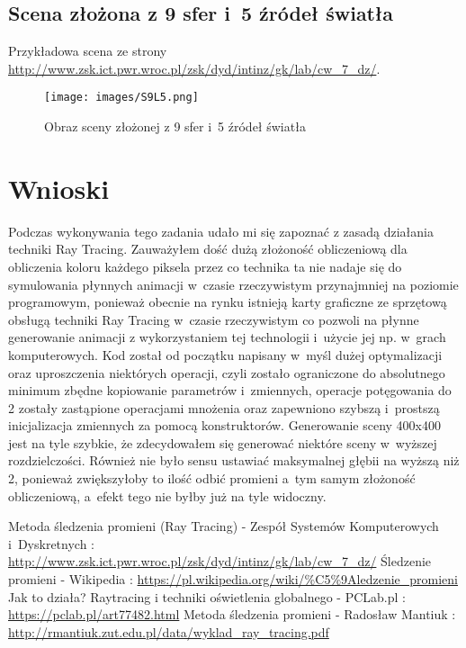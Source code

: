 \documentclass[11pt,a4paper,titlepage]{article}
\begin{document}
\newpage
\subsection{Scena złożona z 9 sfer i~5 źródeł światła}
Przykładowa scena ze strony \url{http://www.zsk.ict.pwr.wroc.pl/zsk/dyd/intinz/gk/lab/cw_7_dz/}.
\begin{figure}[H]
\centering
\texttt{[image: images/S9L5.png]}
\caption{Obraz sceny złożonej z 9 sfer i~5 źródeł światła}
\label{fig:eggWithLight}
\end{figure}

\section{Wnioski}
Podczas wykonywania tego zadania udało mi się zapoznać z zasadą działania techniki Ray Tracing. Zauważyłem dość dużą złożoność obliczeniową dla obliczenia koloru każdego piksela przez co technika ta nie nadaje się do symulowania płynnych animacji w~czasie rzeczywistym przynajmniej na poziomie programowym, ponieważ obecnie na rynku istnieją karty graficzne ze sprzętową obsługą techniki Ray Tracing w~czasie rzeczywistym co pozwoli na płynne generowanie animacji z wykorzystaniem tej technologii i~użycie jej np. w~grach komputerowych. \newline
Kod został od początku napisany w~myśl dużej optymalizacji oraz uproszczenia niektórych operacji, czyli zostało ograniczone do absolutnego minimum zbędne kopiowanie parametrów i~zmiennych, operacje potęgowania do 2 zostały zastąpione operacjami mnożenia oraz zapewniono szybszą i~prostszą inicjalizacja zmiennych za pomocą konstruktorów. Generowanie sceny 400x400 jest na tyle szybkie, że zdecydowałem się generować niektóre sceny w~wyższej rozdzielczości. Również nie było sensu ustawiać maksymalnej głębii na wyższą niż 2, ponieważ zwiększyłoby to ilość odbić promieni a~tym samym złożoność obliczeniową, a~efekt tego nie byłby już na tyle widoczny.

\newpage

\begin{thebibliography}{99}

 Metoda śledzenia promieni (Ray Tracing) - Zespół Systemów Komputerowych i~Dyskretnych : \newline\url{http://www.zsk.ict.pwr.wroc.pl/zsk/dyd/intinz/gk/lab/cw_7_dz/}
 Śledzenie promieni - Wikipedia : \newline\url{https://pl.wikipedia.org/wiki/%C5%9Aledzenie_promieni}
 Jak to działa? Raytracing i techniki oświetlenia globalnego - PCLab.pl : \newline\url{https://pclab.pl/art77482.html}
 Metoda śledzenia promieni - Radosław Mantiuk : \newline\url{http://rmantiuk.zut.edu.pl/data/wyklad_ray_tracing.pdf}

\end{thebibliography}



\listoffigures
\listoflistings
\end{document}
